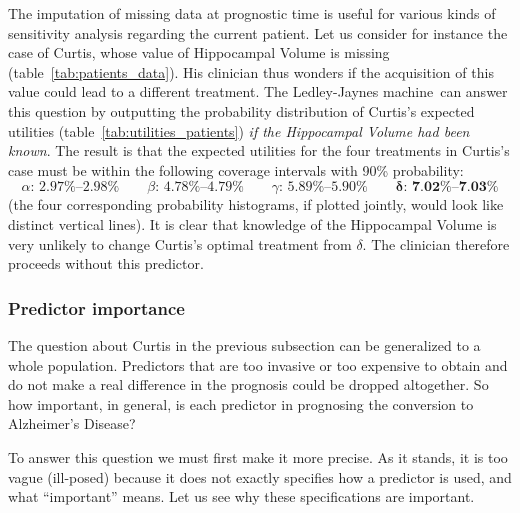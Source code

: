 \documentclass[utf8]{FrontiersinHarvard} %
\renewcommand*{\|}[1][]{\nonscript\:#1\vert\nonscript\:\mathopen{}}
\newcommand*{\ad}{Alzheimer's Disease}
\newcommand*{\ljm}{Ledley-Jaynes machine}
\begin{document}
The imputation of missing data at prognostic time is useful for various kinds of sensitivity analysis regarding the current patient. Let us consider for instance the case of Curtis, whose value of Hippocampal Volume is missing (table~\ref{tab:patients_data}). His clinician thus wonders if the acquisition of this value could lead to a different treatment. The \ljm\ can answer this question by outputting the probability distribution of Curtis's expected utilities (table~\ref{tab:utilities_patients}) \emph{if the Hippocampal Volume had been known}. The result is that the expected utilities for the four treatments in Curtis's case must be within the following coverage intervals with 90\% probability:
\begin{equation}
  \label{eq:possible_utilities_curtis}
  \alpha\text{: 2.97\%--2.98\%}\qquad
  \beta\text{: 4.78\%--4.79\%}\qquad
  \gamma\text{: 5.89\%--5.90\%}\qquad
  \bm{\delta}\textbf{: 7.02\%--7.03\%}
\end{equation}
(the four corresponding probability histograms, if plotted jointly, would look like distinct vertical lines). It is clear that knowledge of the Hippocampal Volume is very unlikely to change Curtis's optimal treatment from $\delta$. The clinician therefore proceeds without this predictor.


\subsubsection{Predictor importance}
\label{sec:predictor_importance}


The question about Curtis in the previous subsection can be generalized to a whole population. Predictors that are too invasive or too expensive to obtain and do not make a real difference in the prognosis could be dropped altogether. So how important, in general, is each predictor in prognosing the conversion to \ad?

To answer this question we must first make it more precise. As it stands, it is too vague (ill-posed) because it does not exactly specifies how a predictor is used, and what \enquote{important} means. Let us see why these specifications are important.
\end{document}
